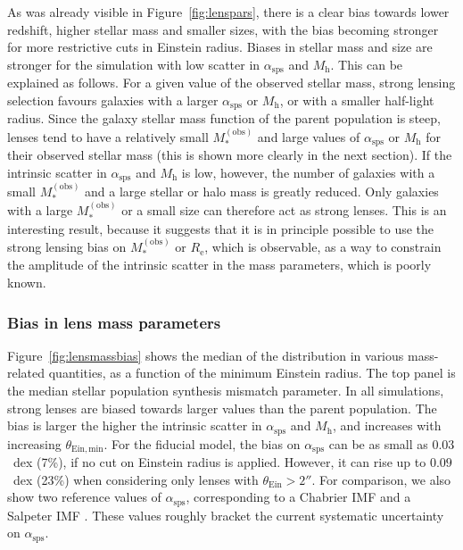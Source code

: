 \documentclass{aa}
\def\reff{R_{\mathrm{e}}}
\def\asps{\alpha_{\mathrm{sps}}}
\def\mobs{M_*^{(\mathrm{obs})}}
\def\mhalo{M_{\mathrm{h}}}
\def\tein{\theta_{\mathrm{Ein}}}
\def\Fref#1{Figure~\ref{#1}\xspace}
\begin{document}
As was already visible in \Fref{fig:lenspars}, there is a clear bias towards lower redshift, higher stellar mass and smaller sizes, with the bias becoming stronger for more restrictive cuts in Einstein radius.
Biases in stellar mass and size are stronger for the simulation with low scatter in $\asps$ and $\mhalo$.
This can be explained as follows.
For a given value of the observed stellar mass, strong lensing selection favours galaxies with a larger $\asps$ or $\mhalo$, or with a smaller half-light radius.
Since the galaxy stellar mass function of the parent population is steep, lenses tend to have a relatively small $\mobs$ and large values of $\asps$ or $\mhalo$ for their observed stellar mass (this is shown more clearly in the next section).
If the intrinsic scatter in $\asps$ and $\mhalo$ is low, however, the number of galaxies with a small $\mobs$ and a large stellar or halo mass is greatly reduced.
Only galaxies with a large $\mobs$ or a small size can therefore act as strong lenses.
This is an interesting result, because it suggests that it is in principle possible to use the strong lensing bias on $\mobs$ or $\reff$, which is observable, as a way to constrain the amplitude of the intrinsic scatter in the mass parameters, which is poorly known.

\subsubsection{Bias in lens mass parameters}

\Fref{fig:lensmassbias} shows the median of the distribution in various mass-related quantities, as a function of the minimum Einstein radius.
The top panel is the median stellar population synthesis mismatch parameter.
In all simulations, strong lenses are biased towards larger values than the parent population. The bias is larger the higher the intrinsic scatter in $\asps$ and $\mhalo$, and increases with increasing $\theta_{\mathrm{Ein,min}}$.
For the fiducial model, the bias on $\asps$ can be as small as $0.03$~dex (7\%), if no cut on Einstein radius is applied.
However, it can rise up to $0.09$~dex (23\%) when considering only lenses with $\tein > 2''$.
For comparison, we also show two reference values of $\asps$, corresponding to a Chabrier IMF \citep{Cha03} and a Salpeter IMF \citep{Sal55}.
These values roughly bracket the current systematic uncertainty on $\asps$.
\end{document}

